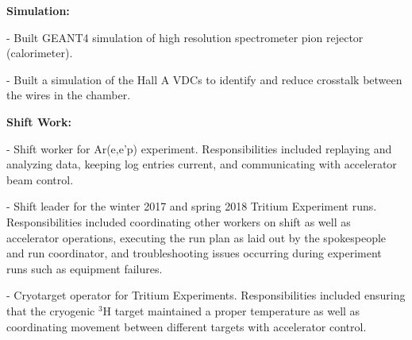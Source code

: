 \documentclass[letterpaper,10pt]{article}
\renewenvironment{itemize}{
  \begin{list}{}{
    \setlength{\leftmargin}{1.5em}
  }
}{
  \end{list}
}
\begin{document}
{\begin{itemize}
\begin{itemize}
   \item \textbf{Simulation:}
     \begin{itemize}\itemsep1pt \parskip0pt 
      \item - Built GEANT4 simulation of high resolution spectrometer pion rejector (calorimeter).
      \item - Built a simulation of the Hall A VDCs to identify and reduce crosstalk between the wires in the chamber. 
     \end{itemize} 
     
     \item \textbf{Shift Work:}
     \begin{itemize}\itemsep1pt \parskip0pt 
      \item - Shift worker for Ar(e,e'p) experiment. Responsibilities included replaying and analyzing data, keeping log entries current, and communicating with accelerator beam control.
      \item - Shift leader for the winter 2017 and spring 2018 Tritium Experiment runs. Responsibilities included coordinating other workers on shift as well as accelerator operations, executing the run plan as laid out by the spokespeople and run coordinator, and troubleshooting issues occurring during experiment runs such as equipment failures.
      \item - Cryotarget operator for Tritium Experiments. Responsibilities included ensuring that the cryogenic   $^{3}$H target maintained a proper temperature as well as coordinating movement between different targets with accelerator control.
     \end{itemize} 
     
 \end{itemize}


\end{itemize}}
\end{document}

